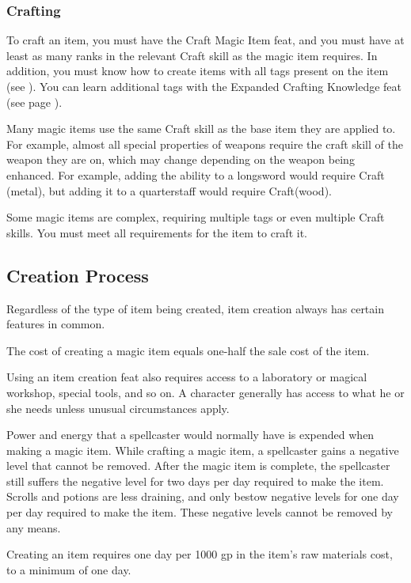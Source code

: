 \subsubsection{Crafting}
    To craft an item, you must have the Craft Magic Item feat, and you must have at least as many ranks in the relevant Craft skill as the magic item requires.
    In addition, you must know how to create items with all tags present on the item (see ).
    You can learn additional tags with the Expanded Crafting Knowledge feat (see page ).

    Many magic items use the same Craft skill as the base item they are applied to. For example, almost all special properties of weapons require the craft skill of the weapon they are on, which may change depending on the weapon being enhanced. For example, adding the  ability to a longsword would require Craft (metal), but adding it to a quarterstaff would require Craft(wood).

    Some magic items are complex, requiring multiple tags or even multiple Craft skills. You must meet all requirements for the item to craft it.

\subsection{Creation Process}
Regardless of the type of item being created, item creation always has certain features in common.

 The cost of creating a magic item equals one-half the sale cost of the item.

Using an item creation feat also requires access to a laboratory or magical workshop, special tools, and so on. A character generally has access to what he or she needs unless unusual circumstances apply.

 Power and energy that a spellcaster would normally have is expended when making a magic item. While crafting a magic item, a spellcaster gains a negative level that cannot be removed. After the magic item is complete, the spellcaster still suffers the negative level for two days per day required to make the item. Scrolls and potions are less draining, and only bestow negative levels for one day per day required to make the item. These negative levels cannot be removed by any means.

 Creating an item requires one day per 1000 gp in the item's raw materials cost, to a minimum of one day.


